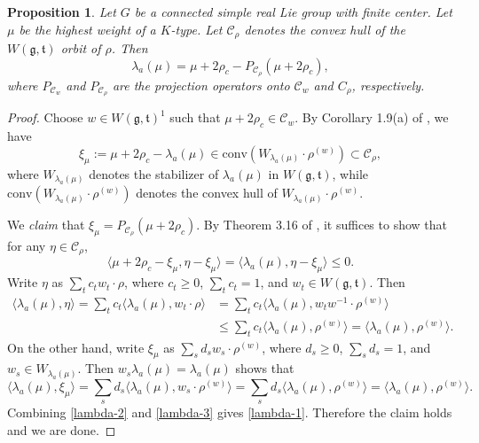 \documentclass[11pt]{amsart}
\theoremstyle{plain}
\newtheorem{prop}[thm]{Proposition}
\theoremstyle{definition}
\newcommand{\mfg}{\mathfrak{g}}
\newcommand{\mft}{\mathfrak{t}}
\newcommand{\C}{\mathcal{C}}
\begin{document}
 \begin{prop}\label{lambda-rho}
 	Let $G$ be a connected simple real Lie group with finite center. Let $\mu$ be the highest weight of a $K$-type. Let $\C_\rho$ denotes the convex hull of the $W(\mfg,\mft)$ orbit of $\rho$. Then
 	\[\lambda_a(\mu)=\mu+2\rho_c-P_{\C_\rho}(\mu+2\rho_c),\]
 	where $P_{\C_w}$ and $P_{\C_\rho}$ are the projection operators onto $\C_w$ and $C_\rho$, respectively.	
 \end{prop}
 \begin{proof}
 	Choose $w\in W(\mfg,\mft)^1$ such that $\mu+2\rho_c\in \C_w$. By Corollary 1.9(a) of \cite{SV}, we have
 	\[\xi_\mu:=\mu+2\rho_c-\lambda_a(\mu)\in \mathrm{conv}(W_{\lambda_a(\mu)}\cdot \rho^{(w)})\subset \C_\rho,\]
 	where $W_{\lambda_a(\mu)}$ denotes the stabilizer of $\lambda_a(\mu)$ in $W(\mfg,\mft)$, while $\mathrm{conv}(W_{\lambda_a(\mu)}\cdot\rho^{(w)})$ denotes the convex hull of $W_{\lambda_a(\mu)}\cdot \rho^{(w)}$.

 We \emph{claim} that $\xi_\mu=P_{\C_\rho}(\mu+2\rho_c)$. By Theorem 3.16 of \cite{BC}, it suffices to show that for any $\eta\in \C_\rho$,
 	\begin{equation}\label{lambda-1}
 		\langle \mu+2\rho_c-\xi_\mu,\eta-\xi_\mu\rangle=\langle \lambda_a(\mu),\eta-\xi_\mu\rangle\le 0.
 	\end{equation}
 	Write $\eta$ as $\sum_{t}c_t w_t\cdot\rho$, where $c_t\ge 0$, $\sum_t c_t=1$, and $w_t\in W(\mfg,\mft)$. Then
 	\begin{equation}\label{lambda-2}
 		\begin{split}
 			\langle \lambda_a(\mu), \eta\rangle= \sum_t c_t \langle \lambda_a(\mu), w_t\cdot \rho\rangle &=\sum_t c_t \langle \lambda_a(\mu), w_tw^{-1}\cdot \rho^{(w)}\rangle\\
 			&\le \sum_t c_t \langle \lambda_a(\mu), \rho^{(w)}\rangle=\langle \lambda_a(\mu), \rho^{(w)}\rangle.
 		\end{split}
 	\end{equation}
 	On the other hand, write $\xi_\mu$ as $\sum_{s}d_s w_s\cdot\rho^{(w)}$, where $d_s\ge 0$, $\sum_s d_s=1$, and $w_s\in W_{\lambda_a(\mu)}$. Then $w_s\lambda_a(\mu)=\lambda_a(\mu)$ shows that
 	\begin{equation}\label{lambda-3}
 		\langle \lambda_a(\mu), \xi_\mu\rangle=\sum_{s}d_s \langle \lambda_a(\mu), w_s\cdot\rho^{(w)}\rangle=\sum_{s}d_s \langle \lambda_a(\mu), \rho^{(w)}\rangle=\langle \lambda_a(\mu), \rho^{(w)}\rangle.
 	\end{equation}
 	Combining \eqref{lambda-2} and \eqref{lambda-3} gives \eqref{lambda-1}. Therefore the claim holds and we are done.
 \end{proof}
\end{document}
